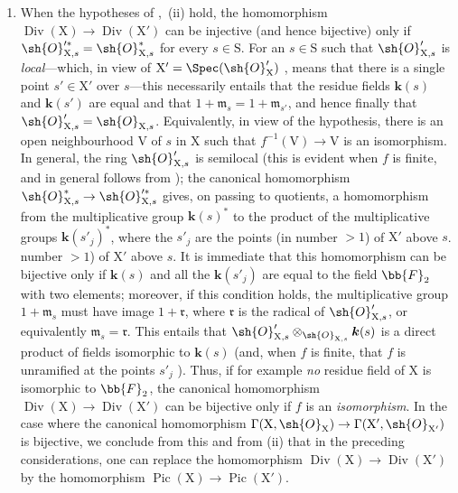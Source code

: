 \begin{remark}[21.8.6]
\begin{enumerate}[label=(\roman*)]
  \item When the hypotheses of ,{}~(ii) hold, the homomorphism $\operatorname{Div}(\mathrm{X})\to\operatorname{Div}(\mathrm{X}')$ can be injective (and hence bijective) only if $\sh{O}'^{*}_{\mathrm{X},s}=\sh{O}^*_{\mathrm{X},s}$ for every $s\in\mathrm{S}$.
For an $s\in\mathrm{S}$ such that $\sh{O}'_{\mathrm{X},s}$ is \emph{local}---which, in view of $\mathrm{X}'=\Spec(\sh{O}'_\mathrm{X})$ , means that there is a single point $s'\in\mathrm{X}'$ over $s$---this necessarily entails that the residue fields $\boldsymbol{k}(s)$ and $\boldsymbol{k}(s')$ are equal and that $1+\mathfrak{m}_s=1+\mathfrak{m}_{s'}$, and hence finally that $\sh{O}'_{\mathrm{X},s}=\sh{O}_{\mathrm{X},s}$.
Equivalently, in view of the hypothesis, there is an open neighbourhood $\mathrm{V}$ of $s$ in $\mathrm{X}$ such that $f^{-1}(\mathrm{V})\to\mathrm{V}$ is an isomorphism.
In general, the ring $\sh{O}'_{\mathrm{X},s}$ is semilocal (this is evident when $f$ is finite, and in general follows from ); the canonical homomorphism $\sh{O}^{*}_{\mathrm{X},s}\to\sh{O}'^{*}_{\mathrm{X},s}$ gives, on passing to quotients, a homomorphism from the multiplicative group $\boldsymbol{k}(s)^*$ to the product of the multiplicative groups $\boldsymbol{k}(s'_j)^*$, where the $s'_j$ are the points (in
number $>1$) of $\mathrm{X}'$ above $s$.
number $>1$) of $\mathrm{X}'$ above $s$.
It is immediate that this homomorphism can be bijective only if $\boldsymbol{k}(s)$ and all the $\boldsymbol{k}(s'_j)$ are equal to the field $\bb{F}_2$ with two elements;
moreover, if this condition holds, the multiplicative group $1+\mathfrak{m}_s$ must have image $1+\mathfrak{r}$, where $\mathfrak{r}$ is the radical of $\sh{O}'_{\mathrm{X},s}$, or equivalently $\mathfrak{m}_s=\mathfrak{r}$.
This entails that $\sh{O}'_{\mathrm{X},s}\otimes_{\sh{O}_{\mathrm{X},s}}\boldsymbol{k}(s)$ is a direct product of fields isomorphic to $\boldsymbol{k}(s)$ (and, when $f$ is finite, that $f$ is unramified at the points $s'_j$ ).
Thus, if for example \emph{no} residue field of $\mathrm{X}$ is isomorphic to $\bb{F}_2$, the canonical homomorphism $\operatorname{Div}(\mathrm{X})\to\operatorname{Div}(\mathrm{X}')$ can be bijective only if $f$ is an \emph{isomorphism}.
In the case where the canonical homomorphism $\Gamma(\mathrm{X},\sh{O}_\mathrm{X})\to\Gamma(\mathrm{X}',\sh{O}_{\mathrm{X}'})$ is bijective, we conclude from this and from (ii) that in the preceding considerations, one can replace the homomorphism $\operatorname{Div}(\mathrm{X})\to\operatorname{Div}(\mathrm{X}')$ by the homomorphism $\operatorname{Pic}(\mathrm{X})\to\operatorname{Pic}(\mathrm{X}')$.
\end{enumerate}
\end{remark}


